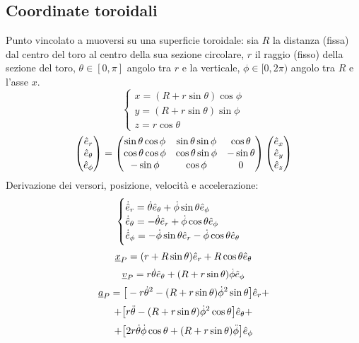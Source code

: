 \documentclass[11pt,landscape,a4paper]{article}
\begin{document}
\begin{multicols}{3}
    \subsection{Coordinate toroidali}
        Punto vincolato a muoversi su una superficie toroidale: sia $R$ la distanza (fissa) dal centro del toro al centro della sua sezione circolare, $r$ il raggio (fisso) della sezione del toro, $\theta \in [0, \pi]$ angolo tra $r$ e la verticale, $\phi \in [0, 2\pi)$ angolo tra $R$ e l'asse $x$. 
        $$ \begin{cases}
            x = (R + r \sin \theta) \cos \phi\\
            y = (R + r \sin \theta) \sin \phi\\
            z = r \cos \theta
        \end{cases}$$ 
        $$ \begin{pmatrix}
            \hat{e}_r\\ \hat{e}_\theta \\ \hat{e}_\phi
        \end{pmatrix} = 
        \begin{pmatrix}
            \sin \theta \cos \phi & \sin \theta \sin \phi & \cos \theta \\
            \cos \theta \cos \phi & \cos \theta \sin \phi & -\sin \theta \\
            - \sin \phi & \cos \phi & 0
        \end{pmatrix} \begin{pmatrix} \hat{e}_x \\ \hat{e}_y \\ \hat{e}_z \end{pmatrix}$$
        Derivazione dei versori, posizione, velocità e accelerazione:
        $$ \begin{cases}
            \dot{\hat{e}}_r = \dot{\theta} \hat{e}_\theta + \dot{\phi} \sin \theta \hat{e}_\phi\\
            \dot{\hat{e}}_\theta = -\dot{\theta} \hat{e}_r + \dot{\phi} \cos \theta \hat{e}_\phi\\
            \dot{\hat{e}}_\phi  = - \dot{\phi} \sin \theta \hat{e}_r - \dot{\phi}\cos \theta \hat{e}_\theta
        \end{cases}$$
        $$ \underline{x}_P = (r + R\sin \theta)\hat{e}_r + R\cos \theta \hat{e}_\theta$$
        $$ \underline{v}_P = r \dot{\theta} \hat{e}_\theta + (R + r\sin \theta) \dot{\phi} \hat{e}_\phi$$
        $$ \underline{a}_P =\big[-r \dot \theta ^2 - (R + r\sin \theta) \dot \phi ^2 \sin \theta \big] \hat{e}_r +$$ $$ + \big[r \ddot \theta - (R + r\sin \theta) \dot \phi ^2 \cos \theta \big]\hat{e}_\theta + $$ $$ + \big[2r \dot \theta \dot \phi \cos \theta + (R + r\sin \theta) \ddot \phi \big]\hat{e}_\phi$$
    

\end{multicols}
\end{document}
